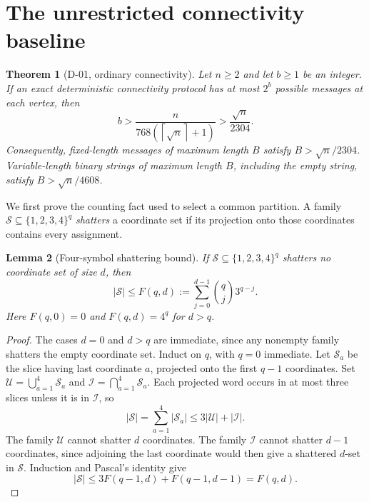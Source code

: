 \documentclass[11pt]{article}
\newtheorem{theorem}{Theorem}[section]
\newtheorem{lemma}[theorem]{Lemma}
\theoremstyle{remark}
\newcommand{\ceil}[1]{\left\lceil #1\right\rceil}
\begin{document}
\section{The unrestricted connectivity baseline}

\begin{theorem}[D-01, ordinary connectivity]\label{thm:baseline}
Let $n\ge2$ and let $b\ge1$ be an integer. If an exact deterministic
connectivity protocol has at most $2^b$ possible messages at each vertex,
then
\begin{equation}\label{eq:baseline}
 b>\frac{n}{768(\ceil{\sqrt n}+1)}
   >\frac{\sqrt n}{2304}.
\end{equation}
Consequently, fixed-length messages of maximum length $B$ satisfy
$B>\sqrt n/2304$. Variable-length binary strings of maximum length $B$,
including the empty string, satisfy $B>\sqrt n/4608$.
\end{theorem}

We first prove the counting fact used to select a common partition.
A family $\mathcal S\subseteq\{1,2,3,4\}^q$ \emph{shatters} a coordinate
set if its projection onto those coordinates contains every assignment.

\begin{lemma}[Four-symbol shattering bound]\label{lem:shattering}
If $\mathcal S\subseteq\{1,2,3,4\}^q$ shatters no coordinate set of
size $d$, then
\[
 |\mathcal S|\le F(q,d):=
 \sum_{j=0}^{d-1}\binom qj3^{q-j}.
\]
Here $F(q,0)=0$ and $F(q,d)=4^q$ for $d>q$.
\end{lemma}

\begin{proof}
The cases $d=0$ and $d>q$ are immediate, since any nonempty family shatters
the empty coordinate set. Induct on $q$, with $q=0$ immediate. Let
$\mathcal S_a$ be the slice having last coordinate $a$, projected onto
the first $q-1$ coordinates. Set
$\mathcal U=\bigcup_{a=1}^4\mathcal S_a$ and
$\mathcal I=\bigcap_{a=1}^4\mathcal S_a$. Each projected word occurs
in at most three slices unless it is in $\mathcal I$, so
\[
 |\mathcal S|=\sum_{a=1}^4|\mathcal S_a|
 \le3|\mathcal U|+|\mathcal I|.
\]
The family $\mathcal U$ cannot shatter $d$ coordinates. The family
$\mathcal I$ cannot shatter $d-1$ coordinates, since adjoining the last
coordinate would then give a shattered $d$-set in $\mathcal S$.
Induction and Pascal's identity give
\[
 |\mathcal S|\le3F(q-1,d)+F(q-1,d-1)=F(q,d).
\]
\end{proof}
\end{document}
